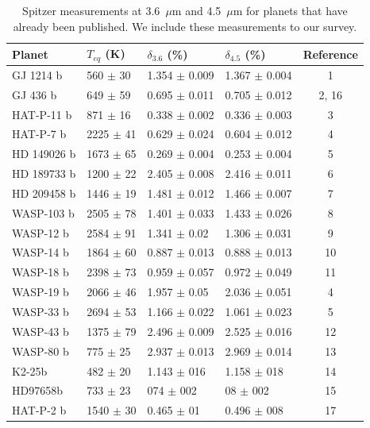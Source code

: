 \begin{table}
\caption{Spitzer measurements at 3.6~$\mu$m and 4.5~$\mu$m for planets that have already been published. We include these measurements to our survey.}
\label{P1:tab:littransits}
\centering
\begin{tabular}{llllc}
\hline\hline
Planet &    $T_{eq}$ (K) & $\delta_{3.6}$ (\%) & $\delta_{4.5}$ (\%) & Reference \\
\hline
GJ 1214 b   &   560 $\pm$ 30 &     1.354 $\pm$ 0.009 &     1.367 $\pm$ 0.004 & 1 \\
GJ 436 b    &   649 $\pm$ 59 &     0.695 $\pm$ 0.011 &     0.705 $\pm$ 0.012 & 2, 16 \\
HAT-P-11 b  &   871 $\pm$ 16 &     0.338 $\pm$ 0.002 &     0.336 $\pm$ 0.003 & 3 \\
HAT-P-7 b   &  2225 $\pm$ 41 &     0.629 $\pm$ 0.024 &     0.604 $\pm$ 0.012 & 4 \\
HD 149026 b &  1673 $\pm$ 65 &     0.269 $\pm$ 0.004 &     0.253 $\pm$ 0.004 & 5 \\
HD 189733 b &  1200 $\pm$ 22 &     2.405 $\pm$ 0.008 &     2.416 $\pm$ 0.011 & 6 \\
HD 209458 b &  1446 $\pm$ 19 &     1.481 $\pm$ 0.012 &     1.466 $\pm$ 0.007 & 7 \\
WASP-103 b  &  2505 $\pm$ 78 &     1.401 $\pm$ 0.033 &     1.433 $\pm$ 0.026 & 8 \\
WASP-12 b   &  2584 $\pm$ 91 &      1.341 $\pm$ 0.02 &     1.306 $\pm$ 0.031 & 9 \\
WASP-14 b   &  1864 $\pm$ 60 &     0.887 $\pm$ 0.013 &     0.888 $\pm$ 0.013 & 10 \\
WASP-18 b   &  2398 $\pm$ 73 &     0.959 $\pm$ 0.057 &     0.972 $\pm$ 0.049 & 11 \\
WASP-19 b   &  2066 $\pm$ 46 &      1.957 $\pm$ 0.05 &     2.036 $\pm$ 0.051 & 4 \\
WASP-33 b   &  2694 $\pm$ 53 &     1.166 $\pm$ 0.022 &     1.061 $\pm$ 0.023 & 5 \\
WASP-43 b   &  1375 $\pm$ 79 &     2.496 $\pm$ 0.009 &     2.525 $\pm$ 0.016 & 12 \\
WASP-80 b   &   775 $\pm$ 25 &     2.937 $\pm$ 0.013 &     2.969 $\pm$ 0.014 & 13 \\
K2-25b      &   482 $\pm$ 20 &     1.143 $\pm$ 016 &     1.158 $\pm$ 018 & 14   \\
HD97658b    &   733 $\pm$ 23 &     074 $\pm$ 002 &      08 $\pm$ 002 & 15 \\
HAT-P-2 b   &  1540 $\pm$ 30 &      0.465 $\pm$ 01 &     0.496 $\pm$ 008 & 17 \\
\hline
\end{tabular}

\end{table}


